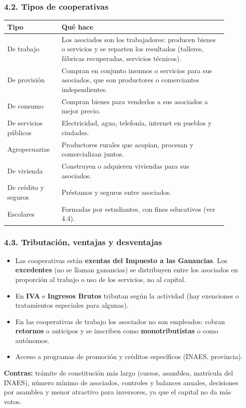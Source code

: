 \subsubsection*{4.2. Tipos de cooperativas}
\begin{center}
\small
\begin{tabular}{|p{0.22\linewidth}|p{0.68\linewidth}|}
\hline
\textbf{Tipo} & \textbf{Qué hace} \\ \hline
De trabajo & Los asociados son los trabajadores: producen bienes o servicios y se reparten
los resultados (talleres, fábricas recuperadas, servicios técnicos). \\ \hline
De provisión & Compran en conjunto insumos o servicios para sus asociados, que son
productores o comerciantes independientes. \\ \hline
De consumo & Compran bienes para venderlos a sus asociados a mejor precio. \\ \hline
De servicios públicos & Electricidad, agua, telefonía, internet en pueblos y ciudades. \\ \hline
Agropecuarias & Productores rurales que acopian, procesan y comercializan juntos. \\ \hline
De vivienda & Construyen o adquieren viviendas para sus asociados. \\ \hline
De crédito y seguros & Préstamos y seguros entre asociados. \\ \hline
Escolares & Formadas por estudiantes, con fines educativos (ver 4.4). \\ \hline
\end{tabular}
\end{center}

\subsubsection*{4.3. Tributación, ventajas y desventajas}
\begin{itemize}
  \item Las cooperativas están \textbf{exentas del Impuesto a las Ganancias}. Los
        \textbf{excedentes} (no se llaman ganancias) se distribuyen entre los asociados en
        proporción al trabajo o uso de los servicios, no al capital.
  \item En \textbf{IVA} e \textbf{Ingresos Brutos} tributan según la actividad (hay exenciones
        o tratamientos especiales para algunas).
  \item En las cooperativas de trabajo los asociados no son empleados: cobran \textbf{retornos}
        o anticipos y se inscriben como \textbf{monotributistas} o como autónomos.
  \item Acceso a programas de promoción y créditos específicos (INAES, provincia).
\end{itemize}
\textbf{Contras:} trámite de constitución más largo (cursos, asamblea, matrícula del INAES),
número mínimo de asociados, controles y balances anuales, decisiones por asamblea y menor
atractivo para inversores, ya que el capital no da más votos.

